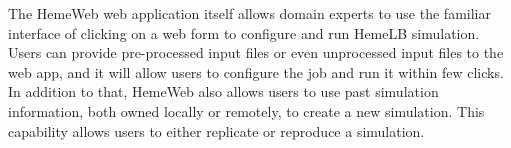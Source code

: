 The HemeWeb web application itself allows domain experts to use the familiar interface of clicking on a web form to configure and run HemeLB simulation. Users can provide pre-processed input files or even unprocessed input files to the web app, and it will allow users to configure the job and run it within few clicks. In addition to that, HemeWeb also allows users to use past simulation information, both owned locally or remotely, to create a new simulation. This capability allows users to either replicate or reproduce a simulation.





